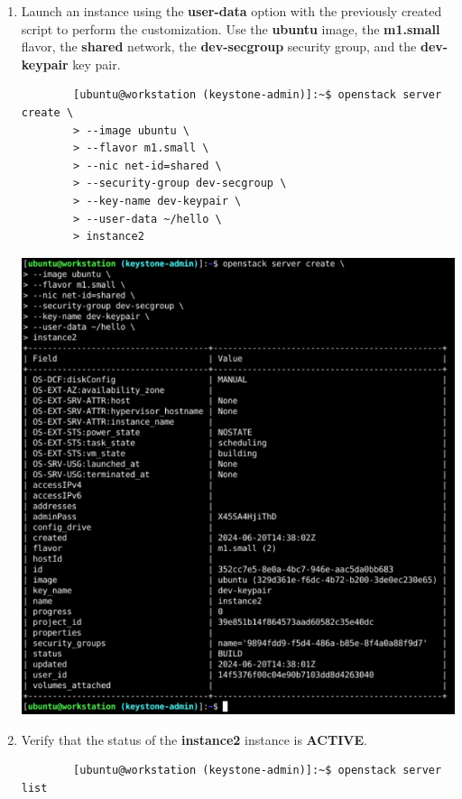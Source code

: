 \documentclass[letterpaper, 12pt]{article}
\begin{document}
\begin{enumerate}
    \item Launch an instance using the \textbf{user-data} option with the previously created script to perform the customization.
    Use the \textbf{ubuntu} image, the \textbf{m1.small} flavor, the \textbf{shared} network, the \textbf{dev-secgroup} security group, and the \textbf{dev-keypair} key pair.
    \begin{lstlisting}
        [ubuntu@workstation (keystone-admin)]:~$ openstack server create \
        > --image ubuntu \
        > --flavor m1.small \
        > --nic net-id=shared \
        > --security-group dev-secgroup \
        > --key-name dev-keypair \
        > --user-data ~/hello \
        > instance2
    \end{lstlisting}

    \begin{center}
        \includegraphics[width=\linewidth]{images/part3/step3.png}
    \end{center}

    \item Verify that the status of the \textbf{instance2} instance is \textbf{ACTIVE}.
    \begin{lstlisting}
        [ubuntu@workstation (keystone-admin)]:~$ openstack server list
    \end{lstlisting}


\end{enumerate}
\end{document}

